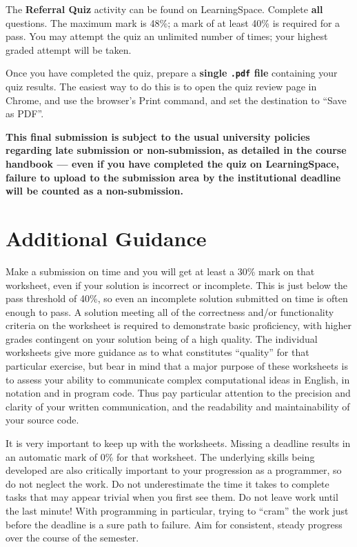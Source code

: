 \documentclass{../../fal_assignment}
\begin{document}
The \textbf{Referral Quiz} activity can be found on LearningSpace. Complete \textbf{all} questions.
The maximum mark is 48\%; a mark of at least 40\% is required for a pass.
You may attempt the quiz an unlimited number of times; your highest graded attempt will be taken.

Once you have completed the quiz, prepare a \textbf{single \texttt{.pdf} file} containing your quiz results.
The easiest way to do this is to open the quiz review page in Chrome, and use the browser's Print command,
and set the destination to ``Save as PDF''.

\textbf{This final submission is subject to the usual university policies regarding late submission or non-submission,
as detailed in the course handbook ---
even if you have completed the quiz on LearningSpace,
failure to upload to the submission area by the institutional deadline will be counted as a non-submission.}

\section*{Additional Guidance}

Make a submission on time and you will get at least a 30\% mark on that worksheet,
even if your solution is incorrect or incomplete.
This is just below the pass threshold of 40\%, so even an incomplete solution submitted on time is often enough to pass.
A solution meeting all of the correctness and/or functionality criteria on the worksheet is required to demonstrate basic proficiency,
with higher grades contingent on your solution being of a high quality.
The individual worksheets give more guidance as to what constitutes ``quality'' for that particular exercise,
but bear in mind that a major purpose of these worksheets is to assess your ability to communicate
complex computational ideas in English, in notation and in program code.
Thus pay particular attention to the precision and clarity of your written communication,
and the readability and maintainability of your source code.

It is very important to keep up with the worksheets. Missing a deadline results in an automatic mark of 0\% for that worksheet.
The underlying skills being developed are also critically important to your progression as a programmer, so do not neglect the work.
Do not underestimate the time it takes to complete tasks that may appear trivial when you first see them.
Do not leave work until the last minute! With programming in particular, trying to ``cram'' the work just before the deadline is a sure path to failure. Aim for consistent, steady progress over the course of the semester.
\end{document}
